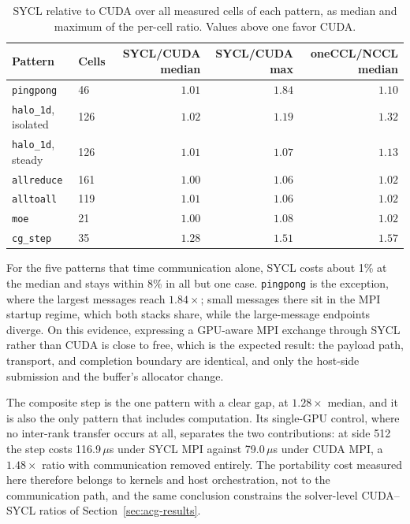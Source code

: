 \begin{table}[htbp]
\centering
\caption{SYCL relative to CUDA over all measured cells of each pattern, as median and maximum of the per-cell ratio. Values above one favor CUDA.}
\label{tab:m-sycl-portability}
\footnotesize
\begin{tabularx}{\textwidth}{lYrrr}
\toprule
Pattern & Cells & SYCL/CUDA median & SYCL/CUDA max & oneCCL/NCCL median\\
\midrule
\texttt{pingpong} & 46 & $1.01$ & $1.84$ & $1.10$\\
\texttt{halo\_1d}, isolated & 126 & $1.02$ & $1.19$ & $1.32$\\
\texttt{halo\_1d}, steady & 126 & $1.01$ & $1.07$ & $1.13$\\
\texttt{allreduce} & 161 & $1.00$ & $1.06$ & $1.02$\\
\texttt{alltoall} & 119 & $1.01$ & $1.06$ & $1.02$\\
\texttt{moe} & 21 & $1.00$ & $1.08$ & $1.02$\\
\midrule
\texttt{cg\_step} & 35 & $1.28$ & $1.51$ & $1.57$\\
\bottomrule
\end{tabularx}
\end{table}

For the five patterns that time communication alone, SYCL costs about 1\% at the median and stays within 8\% in all but one case. \texttt{pingpong} is the exception, where the largest messages reach $1.84\times$; small messages there sit in the MPI startup regime, which both stacks share, while the large-message endpoints diverge. On this evidence, expressing a GPU-aware MPI exchange through SYCL rather than CUDA is close to free, which is the expected result: the payload path, transport, and completion boundary are identical, and only the host-side submission and the buffer's allocator change.

The composite step is the one pattern with a clear gap, at $1.28\times$ median, and it is also the only pattern that includes computation. Its single-GPU control, where no inter-rank transfer occurs at all, separates the two contributions: at side 512 the step costs 116.9\,$\mu$s under SYCL MPI against 79.0\,$\mu$s under CUDA MPI, a $1.48\times$ ratio with communication removed entirely. The portability cost measured here therefore belongs to kernels and host orchestration, not to the communication path, and the same conclusion constrains the solver-level CUDA--SYCL ratios of Section~\ref{sec:acg-results}.

